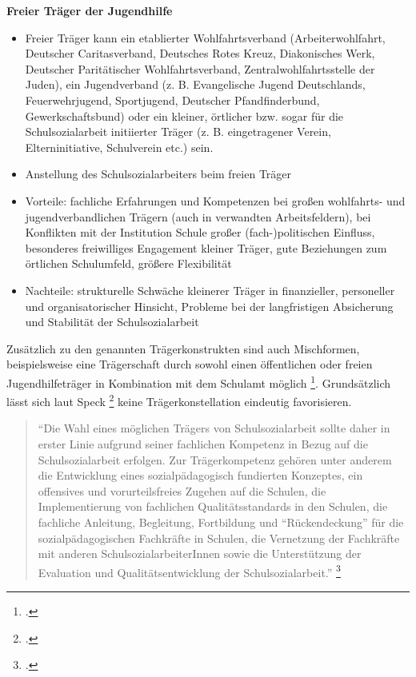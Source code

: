\noindent
\textbf{Freier Träger der Jugendhilfe}\\
\begin{itemize}
	\item Freier Träger kann ein etablierter Wohlfahrtsverband (Arbeiterwohlfahrt, Deutscher Caritasverband, Deutsches Rotes Kreuz, Diakonisches Werk, Deutscher Paritätischer Wohlfahrtsverband, Zentralwohlfahrtsstelle der Juden), ein Jugendverband (z. B. Evangelische Jugend Deutschlands, Feuerwehrjugend, Sportjugend, Deutscher Pfandfinderbund, Gewerkschaftsbund) oder ein kleiner, örtlicher bzw. sogar für die Schulsozialarbeit initiierter Träger (z. B. eingetragener Verein, Elterninitiative, Schulverein etc.) sein.
	\item Anstellung des Schulsozialarbeiters beim freien Träger
	\item Vorteile: fachliche Erfahrungen und Kompetenzen bei großen wohlfahrts- und jugendverbandlichen Trägern (auch in verwandten Arbeitsfeldern), bei Konflikten mit der Institution Schule großer (fach-)politischen Einfluss, besonderes freiwilliges Engagement kleiner Träger, gute Beziehungen zum örtlichen Schulumfeld, größere Flexibilität
	\item Nachteile: strukturelle Schwäche kleinerer Träger in finanzieller, personeller und organisatorischer Hinsicht, Probleme bei der langfristigen Absicherung und Stabilität der Schulsozialarbeit 
\end{itemize}

\noindent
Zusätzlich zu den genannten Trägerkonstrukten sind auch Mischformen, beispielsweise eine Trägerschaft durch sowohl einen öffentlichen oder freien Jugendhilfeträger in Kombination mit dem Schulamt möglich \footcite[vgl.][63]{Spies2011}. Grundsätzlich lässt sich laut Speck \footcite{BIVSD2013} keine Trägerkonstellation eindeutig favorisieren.

\begin{quotation}
\noindent
"`Die Wahl eines möglichen Trägers von Schulsozialarbeit sollte daher in erster Linie aufgrund seiner fachlichen Kompetenz in Bezug auf die Schulsozialarbeit erfolgen. Zur Trägerkompetenz gehören unter anderem die Entwicklung eines sozialpädagogisch fundierten Konzeptes, ein offensives und vorurteilsfreies Zugehen auf die Schulen, die Implementierung von fachlichen Qualitätsstandards in den Schulen, die fachliche Anleitung, Begleitung, Fortbildung und "`Rückendeckung"' für die sozialpädagogischen Fachkräfte in Schulen, die Vernetzung der Fachkräfte mit anderen SchulsozialarbeiterInnen sowie die Unterstützung der Evaluation und Qualitätsentwicklung der Schulsozialarbeit."' \footcite{BIVSD2013}
\end{quotation}

